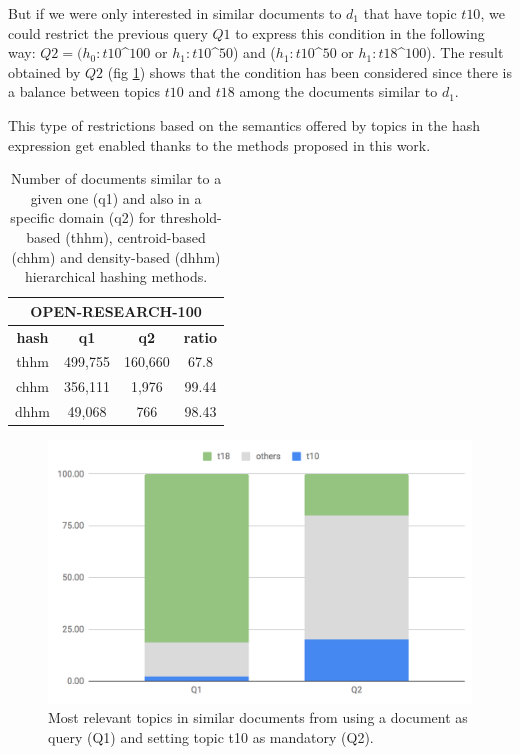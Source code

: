 But if we were only interested in similar documents to $d_1$ that have topic $t10$, we could restrict the previous query $Q1$ to express this condition in the following way: $Q2=(h_0:t10$\^{}$100$ or $h_1:t10$\^{}$50$) and ($h_1:t10$\^{}$50$ or $h_1:t18$\^{}$100$). The result obtained by $Q2$ (fig \ref{fig:exploration}) shows that the condition has been considered since there is a balance between topics $t10$ and $t18$ among the documents similar to $d_1$.

This type of restrictions based on the semantics offered by topics in the hash expression get enabled thanks to the methods proposed in this work.

\begin{table}\centering
\small
\begin{tabular}{ |c||c|c||c|  }
 \hline
 \multicolumn{4}{|c|}{OPEN-RESEARCH-100} \\
 \hline
 \textbf{hash} & \textbf{q1} & \textbf{q2} & \textbf{ratio} \\
 \hline
 thhm & 499,755 & 160,660 & 67.8 \\
 chhm & 356,111 & 1,976 & 99.44  \\
 dhhm & 49,068 & 766 & 98.43 \\
 \hline
\end{tabular}
\caption{Number of documents similar to a given one (q1) and also in a specific domain (q2) for threshold-based (thhm), centroid-based (chhm) and density-based (dhhm) hierarchical hashing methods.}
\label{tb:exploration}
\end{table}

\begin{figure}[t]\centering
\includegraphics[scale=0.35]{exploration.png}
\caption{Most relevant topics in similar documents from using a document as query (Q1) and setting topic t10 as mandatory (Q2).}
\label{fig:exploration}
\end{figure}


